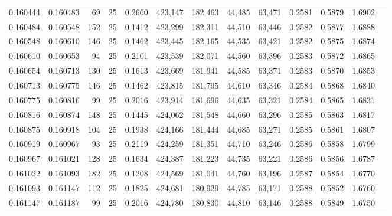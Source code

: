 \begin{tabular}{rrrrrrrrrrrrr}
0.160444 & 0.160483 &    69 &  25 &                                     0.2660 & 423,147 & 182,463 &  44,485 &  63,471 & 0.2581 & 0.5879 & 1.6902 \\
0.160484 & 0.160548 &   152 &  25 &                                     0.1412 & 423,299 & 182,311 &  44,510 &  63,446 & 0.2582 & 0.5877 & 1.6888 \\
0.160548 & 0.160610 &   146 &  25 &                                     0.1462 & 423,445 & 182,165 &  44,535 &  63,421 & 0.2582 & 0.5875 & 1.6874 \\
0.160610 & 0.160653 &    94 &  25 &                                     0.2101 & 423,539 & 182,071 &  44,560 &  63,396 & 0.2583 & 0.5872 & 1.6865 \\
0.160654 & 0.160713 &   130 &  25 &                                     0.1613 & 423,669 & 181,941 &  44,585 &  63,371 & 0.2583 & 0.5870 & 1.6853 \\
0.160713 & 0.160775 &   146 &  25 &                                     0.1462 & 423,815 & 181,795 &  44,610 &  63,346 & 0.2584 & 0.5868 & 1.6840 \\
0.160775 & 0.160816 &    99 &  25 &                                     0.2016 & 423,914 & 181,696 &  44,635 &  63,321 & 0.2584 & 0.5865 & 1.6831 \\
0.160816 & 0.160874 &   148 &  25 &                                     0.1445 & 424,062 & 181,548 &  44,660 &  63,296 & 0.2585 & 0.5863 & 1.6817 \\
0.160875 & 0.160918 &   104 &  25 &                                     0.1938 & 424,166 & 181,444 &  44,685 &  63,271 & 0.2585 & 0.5861 & 1.6807 \\
0.160919 & 0.160967 &    93 &  25 &                                     0.2119 & 424,259 & 181,351 &  44,710 &  63,246 & 0.2586 & 0.5858 & 1.6799 \\
0.160967 & 0.161021 &   128 &  25 &                                     0.1634 & 424,387 & 181,223 &  44,735 &  63,221 & 0.2586 & 0.5856 & 1.6787 \\
0.161022 & 0.161093 &   182 &  25 &                                     0.1208 & 424,569 & 181,041 &  44,760 &  63,196 & 0.2587 & 0.5854 & 1.6770 \\
0.161093 & 0.161147 &   112 &  25 &                                     0.1825 & 424,681 & 180,929 &  44,785 &  63,171 & 0.2588 & 0.5852 & 1.6760 \\
0.161147 & 0.161187 &    99 &  25 &                                     0.2016 & 424,780 & 180,830 &  44,810 &  63,146 & 0.2588 & 0.5849 & 1.6750 \\

\end{tabular}
